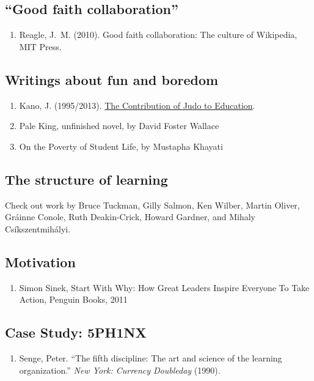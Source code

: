\subsection{``Good faith collaboration''}

\begin{enumerate}
\item Reagle, J.~M. (2010).  Good faith collaboration: The culture of Wikipedia,
MIT Press.
\end{enumerate}

\subsection{Writings about fun and boredom}

\begin{enumerate}
\item
  Kano, J. (1995/2013).   \href{http://judoinfo.com/kano.htm}{The Contribution of Judo to Education}.
\item
  Pale King, unfinished novel, by David Foster Wallace
\item
  On the Poverty of Student Life, by Mustapha Khayati
\end{enumerate}

\subsection{The structure of learning}

\noindent Check out work by Bruce Tuckman, Gilly Salmon, Ken Wilber, Martin
Oliver, Gráinne Conole, Ruth Deakin-Crick, Howard Gardner, and Mihaly
Csíkszentmihályi.

\subsection{Motivation}

\begin{enumerate}
\item
  Simon Sinek, Start With Why: How Great Leaders Inspire Everyone To
  Take Action, Penguin Books, 2011
\end{enumerate}
\subsection{Case Study: 5PH1NX}

\begin{enumerate}
\item
  Senge, Peter. ``The fifth discipline: The art and science of the
  learning organization.'' \emph{New York: Currency Doubleday} (1990).
\end{enumerate}

